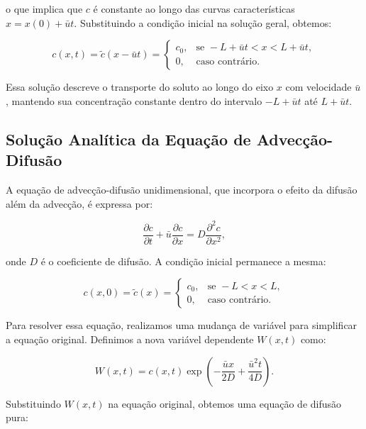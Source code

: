 o que implica que \( c \) é constante ao longo das curvas características \( x = x(0) + \bar{u} t \). Substituindo a condição inicial na solução geral, obtemos:

\begin{equation}
    c(x, t) = \tilde{c}(x - \bar{u}t) = \begin{cases}
    c_0, & \text{se } -L + \bar{u}t < x < L + \bar{u}t, \\
    0, & \text{caso contrário}.
    \end{cases}
\end{equation}

Essa solução descreve o transporte do soluto ao longo do eixo \( x \) com velocidade \( \bar{u} \), mantendo sua concentração constante dentro do intervalo \( -L + \bar{u}t \) até \( L + \bar{u}t \).

\subsection{Solução Analítica da Equação de Advecção-Difusão}

A equação de advecção-difusão unidimensional, que incorpora o efeito da difusão além da advecção, é expressa por:

\begin{equation}
    \frac{\partial c}{\partial t} + \bar{u} \frac{\partial c}{\partial x} = D \frac{\partial^2 c}{\partial x^2},
\end{equation}

onde \( D \) é o coeficiente de difusão. A condição inicial permanece a mesma:

\begin{equation}
    c(x, 0) = \tilde{c}(x) = \begin{cases}
    c_0, & \text{se } -L < x < L, \\
    0, & \text{caso contrário}.
    \end{cases}
\end{equation}

Para resolver essa equação, realizamos uma mudança de variável para simplificar a equação original. Definimos a nova variável dependente \( W(x, t) \) como:

\begin{equation}
    W(x, t) = c(x, t) \exp\left( -\frac{\bar{u} x}{2D} + \frac{\bar{u}^2 t}{4D} \right).
\end{equation}

Substituindo \( W(x, t) \) na equação original, obtemos uma equação de difusão pura:

